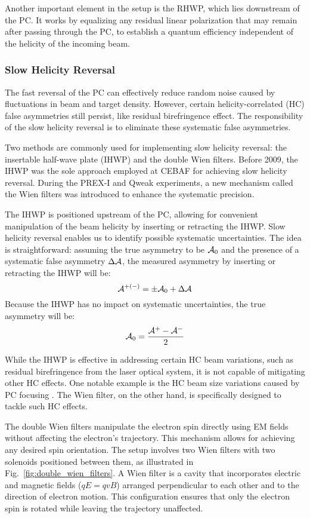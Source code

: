 Another important element in the setup is the RHWP, which lies downstream of the PC.
It works by equalizing any residual linear polarization that may remain after passing through the PC, to establish a quantum efficiency independent of the helicity of the incoming beam.

\subsubsection{Slow Helicity Reversal}
The fast reversal of the PC can effectively reduce random noise caused by fluctuations
in beam and target density. However, certain helicity-correlated (HC) false asymmetries
still persist, like residual birefringence effect. The responsibility
of the slow helicity reversal is to eliminate these systematic false asymmetries.

Two methods are commonly used for implementing slow helicity reversal: 
the insertable half-wave plate (IHWP) and the double Wien filters. 
Before 2009, the IHWP was the sole approach employed at CEBAF for achieving 
slow helicity reversal. During the PREX-I and Qweak experiments, a new 
mechanism called the Wien filters was introduced to enhance the systematic precision.

The IHWP is positioned upstream of the PC, allowing for convenient manipulation
of the beam helicity by inserting or retracting the IHWP. Slow helicity reversal enables us 
to identify possible systematic uncertainties. The idea is straightforward:
assuming the true asymmetry to be $\mathcal{A}_0$ and the presence of a systematic 
false asymmetry $\Delta \mathcal{A}$, the measured asymmetry by inserting or retracting the IHWP will be:
\begin{equation}
    \mathcal{A}^{+(-)} = \pm \mathcal{A}_0  + \Delta \mathcal{A}
\end{equation}
Because the IHWP has no impact on systematic uncertainties, the true asymmetry will be:
\begin{equation}
    \mathcal{A}_0 = \frac{\mathcal{A}^+ - \mathcal{A}^-}{2}
\end{equation}

While the IHWP is effective in addressing certain HC beam variations, such as residual birefringence from the laser optical system, it is not capable of mitigating other HC effects. One notable example is the HC beam size variations caused by PC focusing \cite{osti_1059486}. The Wien filter, on the other hand, is specifically designed to tackle such HC effects.

The double Wien filters manipulate the electron spin directly using EM fields 
without affecting the electron's trajectory. This mechanism allows for achieving any desired spin orientation. 
The setup involves two Wien filters with two solenoids positioned between them, as illustrated in Fig.~\ref{fig:double_wien_filters}. A Wien filter is a cavity that incorporates electric and magnetic fields ($qE = qvB$) arranged perpendicular to each other and to the direction of electron motion. This configuration ensures that only the electron spin is rotated while leaving the trajectory unaffected.


